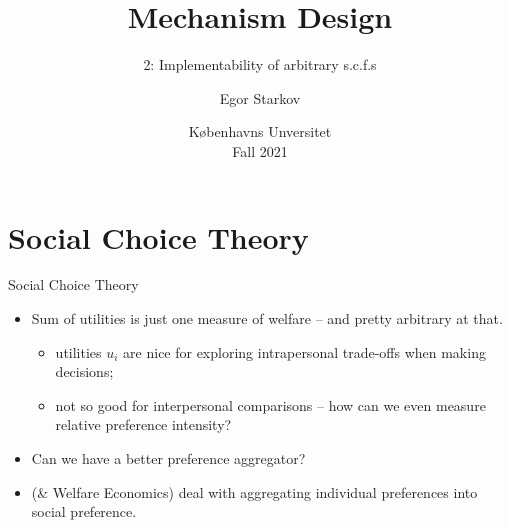 \documentclass[english,10pt
,aspectratio=169
]{beamer}
\title{Mechanism Design}
\subtitle{2: Implementability of arbitrary s.c.f.s}
\author{Egor Starkov}
\date{K{\o}benhavns Unversitet \\
	Fall 2021}
\begin{document}
	\frame[plain]{\titlepage}



\section{Social Choice Theory}


\begin{frame}{Social Choice Theory}
\begin{itemize}
	\item Sum of utilities is just one measure of welfare -- and pretty arbitrary at that.
	\begin{itemize}
		\item utilities $u_i$ are nice for exploring \alert{intra}personal trade-offs when making decisions;
		\item not so good for \alert{inter}personal comparisons -- how can we even measure relative preference intensity?
	\end{itemize}
	\item Can we have a better preference aggregator?
	\item {} (\& Welfare Economics) deal with aggregating individual preferences into social preference.
\end{itemize}
\end{frame}
\end{document}
